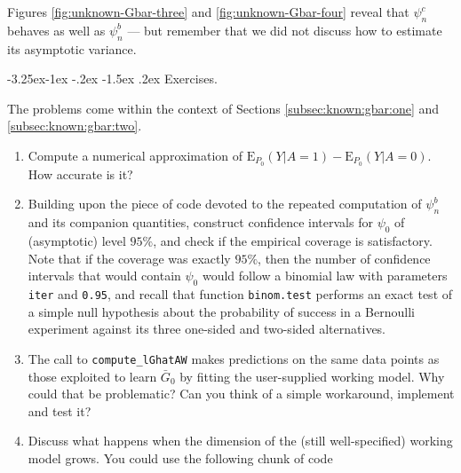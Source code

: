 \documentclass[]{article}
\makeatletter
\renewcommand\subsection{\@startsection{subsection}{3}{\z@}%
                                     {-3.25ex\@plus -1ex \@minus -.2ex}%
                                     {-1.5ex \@plus .2ex}%
                                     {\normalfont\normalsize\bfseries}}
\newcommand{\gear}{\usebox{\gearbox}\;}
\newcommand{\Exp}{\textrm{E}}
\newcommand{\Gbar}{\bar{G}}
\theoremstyle{definition}
\theoremstyle{definition}
\theoremstyle{definition}
\theoremstyle{remark}
\makeatother
\begin{document}
Figures \ref{fig:unknown-Gbar-three} and \ref{fig:unknown-Gbar-four}
reveal that \(\psi_{n}^{c}\) behaves as well as \(\psi_{n}^{b}\) --- but
remember that we did not discuss how to estimate its asymptotic
variance.

\subsection{\gear Exercises.}
\label{subsec:exo:one}

The problems come within the context of Sections
\ref{subsec:known:gbar:one} and \ref{subsec:known:gbar:two}.

\begin{enumerate}
\def\labelenumi{\arabic{enumi}.}
\item
  Compute a numerical approximation of
  \(\Exp_{P_{0}} (Y | A=1) - \Exp_{P_{0}} (Y | A=0)\). How accurate is
  it?
\item
  Building upon the piece of code devoted to the repeated computation of
  \(\psi_{n}^{b}\) and its companion quantities, construct confidence
  intervals for \(\psi_{0}\) of (asymptotic) level \(95\%\), and check
  if the empirical coverage is satisfactory. Note that if the coverage
  was exactly \(95\%\), then the number of confidence intervals that
  would contain \(\psi_{0}\) would follow a binomial law with parameters
  \texttt{iter} and \texttt{0.95}, and recall that function
  \texttt{binom.test} performs an exact test of a simple null hypothesis
  about the probability of success in a Bernoulli experiment against its
  three one-sided and two-sided alternatives.
\item
  The call to \texttt{compute\_lGhatAW} makes predictions on the same
  data points as those exploited to learn \(\Gbar_{0}\) by fitting the
  user-supplied working model. Why could that be problematic? Can you
  think of a simple workaround, implement and test it?
\item
  Discuss what happens when the dimension of the (still well-specified)
  working model grows. You could use the following chunk of code
\end{enumerate}
\end{document}
